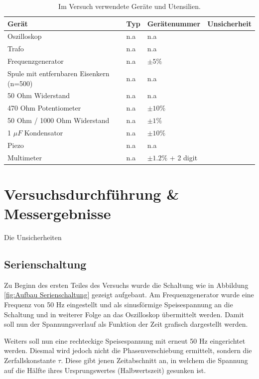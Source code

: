 \documentclass[12pt,a4paper,twoside]{article}
\begin{document}
    \begin{table}[H]
        \centering
        \caption{Im Versuch verwendete Geräte und Utensilien.}
        \label{tab:geraete}
        \begin{tabular}{| l | l | l | l |}
            \hline
            Gerät   & Typ   & Gerätenummer  & Unsicherheit \\
            \hline
            Oszilloskop & {n.a} & {n.a} \\
            Trafo & {n.a} & {n.a} \\
            Frequenzgenerator & {n.a} & $\pm 5\%$ \\
            Spule mit entfernbaren Eisenkern (n=500) & {n.a} & {n.a} \\
            50 Ohm Widerstand & {n.a} & {n.a} \\
            470 Ohm Potentiometer & {n.a} & $\pm 10\%$ \\
            50 Ohm / 1000 Ohm Widerstand & {n.a} & $\pm 1\%$ \\
            1 $\mu F$ Kondensator& {n.a} & $\pm 10\%$ \\
            Piezo & {n.a} & {n.a} \\
            Multimeter & {n.a} & $\pm 1.2\%$ + 2 digit \\
            \hline
        \end{tabular}
    \end{table}


\section{Versuchsdurchführung \& Messergebnisse} %

Die Unsicherheiten

\subsection{Serienschaltung}

Zu Beginn des ersten Teiles des Versuchs wurde die Schaltung wie in Abbildung \ref{fig:Aufbau Serienschaltung} gezeigt aufgebaut. 
Am Frequenzgenerator wurde eine Frequenz von 50 Hz eingestellt und als sinusförmige Speisespannung an die Schaltung und in weiterer Folge an das Oszilloskop übermittelt werden. Damit soll nun der Spannungsverlauf als Funktion der Zeit grafisch dargestellt werden. \newline

\noindent
Weiters soll nun eine rechteckige Speisespannung mit erneut 50 Hz eingerichtet werden. Diesmal wird jedoch nicht die Phasenverschiebung ermittelt, sondern die Zerfallskonstante $\tau$.
Diese gibt jenen Zeitabschnitt an, in welchem die Spannung auf die Hälfte ihres Ursprungswertes (Halbwertszeit) gesunken ist. \newline
\end{document}
